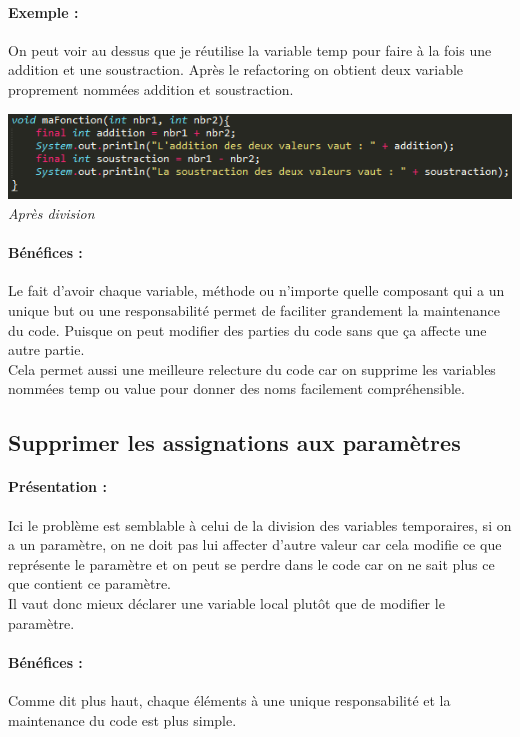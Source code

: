 \documentclass[a4paper,twoside,12pt,openright]{report}
\begin{document}
\paragraph{Exemple :}
On peut voir au dessus que je réutilise la variable temp pour faire à la fois une addition et une soustraction. Après le refactoring on obtient deux variable proprement nommées addition et soustraction.

\begin{center}
\includegraphics[scale=1]{Image/Diviser_Temp2.png}\\
\itshape{Après division}
\end{center}

\paragraph{Bénéfices :}
Le fait d'avoir chaque variable, méthode ou n'importe quelle composant qui a un unique but ou une responsabilité permet de faciliter grandement la maintenance du code. Puisque on peut modifier des parties du code sans que ça affecte une autre partie.\\
Cela permet aussi une meilleure relecture du code car on supprime les variables nommées temp ou value pour donner des noms facilement compréhensible.

\subsection{Supprimer les assignations aux paramètres}
\paragraph{Présentation :}
Ici le problème est semblable à celui de la division des variables temporaires, si on a un paramètre, on ne doit pas lui affecter d'autre valeur car cela modifie ce que représente le paramètre et on peut se perdre dans le code car on ne sait plus ce que contient ce paramètre.\\
Il vaut donc mieux déclarer une variable local plutôt que de modifier le paramètre.

\paragraph{Bénéfices :}
Comme dit plus haut, chaque éléments à une unique responsabilité et la maintenance du code est plus simple.  
\end{document}
